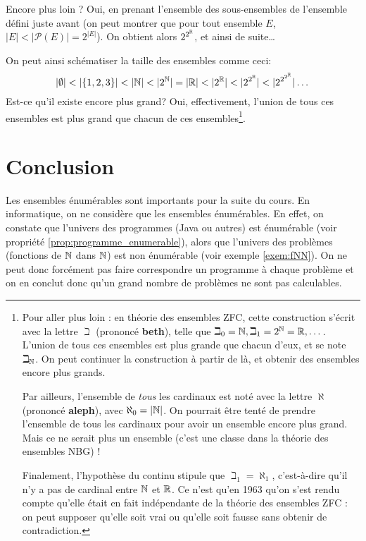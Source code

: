 Encore plus loin ? Oui, en prenant l'ensemble des sous-ensembles de l'ensemble défini juste avant (on peut montrer que pour tout ensemble $E$, $|E|<|\mathcal{P}(E)|=2^{|E|}$). On obtient alors $2^{2^{\mathbb{R}}}$, et ainsi de suite\ldots

On peut ainsi schématiser la taille des ensembles comme ceci:
$$|\emptyset| < |\{1,2,3\}| < |\mathbb{N}| < |2^{\mathbb{N}}| = |\mathbb{R}| < |2^{\mathbb{R}}| < |2^{2^{\mathbb{R}}}| < |2^{2^{2^{\mathbb{R}}}}| \dots$$
Est-ce qu'il existe encore plus grand? Oui, effectivement, l'union de tous ces ensembles
est plus grand que chacun de ces ensembles\footnote{
Pour aller plus loin : en théorie des ensembles ZFC, cette construction s'écrit avec la lettre $\beth$ (prononcé \textbf{beth}), telle que $\beth_0 = \mathbb{N}, \beth_1 = 2^{\mathbb{N}} = \mathbb{R},\dots$. L'union de tous ces ensembles est plus grande que chacun d'eux, et se note $\beth_{\mathbb{N}}$. On peut continuer la construction à partir de là, et obtenir des ensembles encore plus grands.

Par ailleurs, l'ensemble de \emph{tous} les cardinaux est noté avec la lettre $\aleph$ (prononcé \textbf{aleph}), avec $\aleph_0 = \left\lvert\mathbb{N}\right\lvert$. On pourrait être tenté de prendre l'ensemble de tous les cardinaux pour avoir un ensemble encore plus grand. Mais ce ne serait plus un ensemble (c'est une classe dans la théorie des ensembles NBG) !

Finalement, l'hypothèse du continu stipule que $\beth_1 = \aleph_1$, c'est-à-dire qu'il n'y a pas de cardinal entre $\mathbb{N}$ et $\mathbb{R}$. Ce n'est qu'en 1963 qu'on s'est rendu compte qu'elle était en fait indépendante de la théorie des ensembles ZFC : on peut supposer qu'elle soit vrai ou qu'elle soit fausse sans obtenir de contradiction.}.

\section{Conclusion}
\label{sec:concept_conclusion}

Les ensembles énumérables sont importants pour la suite du cours. En
informatique, on ne considère que les ensembles énumérables. En effet, on constate que l'univers des programmes (Java ou autres) est énumérable (voir propriété \ref{prop:programme_enumerable}), alors que l'univers des problèmes (fonctions de $\mathbb{N}$ dans $\mathbb{N}$) est non énumérable (voir exemple \ref{exem:fNN}).
On ne peut donc forcément pas faire correspondre un programme à chaque problème et on en conclut donc qu'un grand nombre de problèmes ne sont pas calculables.
